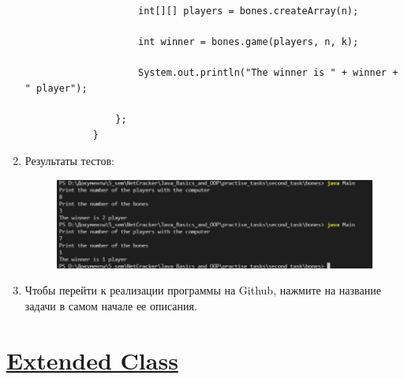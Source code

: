 \documentclass[a4paper]{article}
\begin{document}
\begin{enumerate}
\begin{lstlisting}
                    int[][] players = bones.createArray(n);

                    int winner = bones.game(players, n, k);

                    System.out.println("The winner is " + winner + " player");

                };
            }
        \end{lstlisting}
    
    \item Результаты тестов:
        
        \begin{figure}[h!]
            \begin{center}
                \includegraphics[scale = 0.8]{test_t2.png}
                \label{p2} %
            \end{center}
        \end{figure}

    \item Чтобы перейти к реализации программы на Github, нажмите на название задачи в самом начале ее описания.
    
    \end{enumerate}

\section{\href{https://github.com/julproh/5_sem/tree/main/NetCracker/Java_Basics_and_OOP/practise_tasks/second_task/extended}{Extended Class}}
\end{document}
